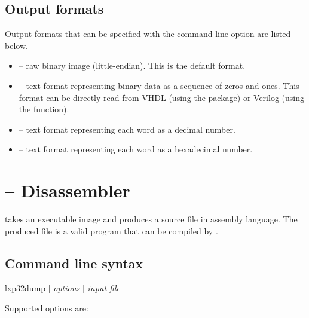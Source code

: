 \documentclass[a4paper,12pt,twoside,extrafontsizes]{memoir}
\begin{document}
\subsection{Output formats}

Output formats that can be specified with the  command line option are listed below.

\begin{itemize}
	\item {} -- raw binary image (little-endian). This is the default format.
	\item {} -- text format representing binary data as a sequence of zeros and ones. This format can be directly read from VHDL (using the  package) or Verilog\textregistered{} (using the  function).
	\item {} -- text format representing each word as a decimal number.
	\item {} -- text format representing each word as a hexadecimal number.
\end{itemize}

\section{ -- Disassembler}

 takes an executable image and produces a source file in \lxp{} assembly language. The produced file is a valid program that can be compiled by .

\subsection{Command line syntax}

\begin{codepar}
    lxp32dump [ \emph{options} | \emph{input file} ]
\end{codepar}

Supported options are:
\end{document}
